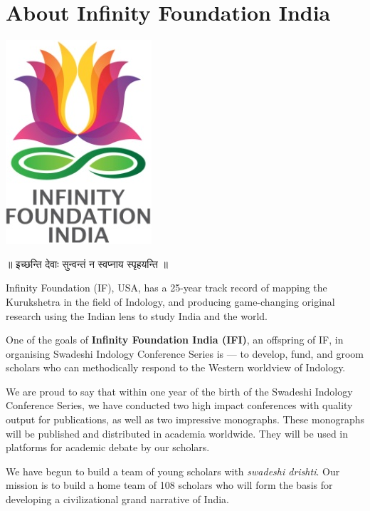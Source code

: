 \thispagestyle{empty}

\chapter*{About Infinity Foundation India}

\centerline{\includegraphics[scale=0.3]{figures/logo.png}}\label{about}
\smallskip

\centerline{{\dev ॥ इच्छन्ति  देवाः सुन्वन्तं न स्वप्नाय स्पृहयन्ति ॥}}
\bigskip


Infinity Foundation (IF), USA, has a 25-year track record of mapping the Kurukshetra in the field of Indology, and producing game-changing original research using the Indian lens to study India and the world. 

One of the goals of {\bf Infinity Foundation India (IFI)}, an offspring of IF, in organising Swadeshi Indology Conference Series is --- to develop, fund, and groom scholars who can methodically respond to the Western worldview of Indology.

We are proud to say that within one year of the birth of the Swadeshi Indology Conference Series, we have conducted two high impact conferences with quality output for publications, as well as two impressive monographs. These monographs will be published and distributed in academia worldwide. They will be used in platforms for academic debate by our scholars.

We have begun to build a team of young scholars with {\sl swadeshi drishti}. Our mission is to build a home team of 108 scholars who will form the basis for developing a civilizational grand narrative of India.
